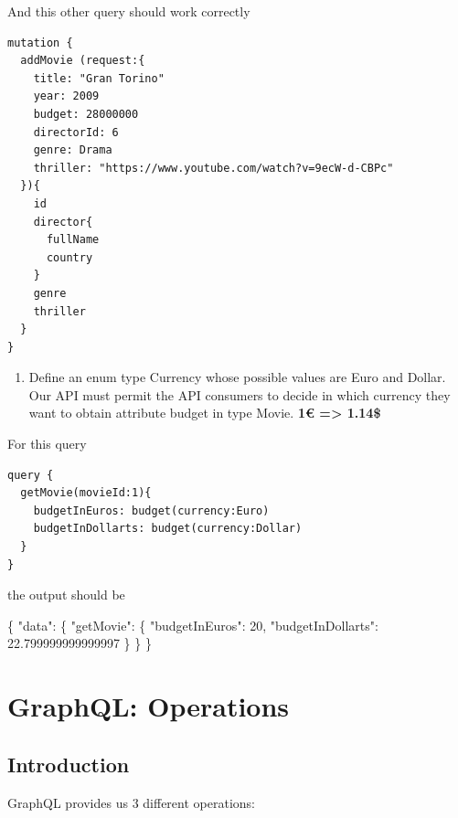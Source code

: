 \documentclass[]{book}
\newcommand{\euro}{€}
\newenvironment{Shaded}{\begin{snugshade}}{\end{snugshade}}
\newcommand{\DataTypeTok}[1]{\textcolor[rgb]{0.13,0.29,0.53}{#1}}
\newcommand{\DecValTok}[1]{\textcolor[rgb]{0.00,0.00,0.81}{#1}}
\newcommand{\FloatTok}[1]{\textcolor[rgb]{0.00,0.00,0.81}{#1}}
\newcommand{\FunctionTok}[1]{\textcolor[rgb]{0.00,0.00,0.00}{#1}}
\providecommand{\tightlist}{%
  \setlength{\itemsep}{0pt}\setlength{\parskip}{0pt}}
\begin{document}
And this other query should work correctly

\begin{verbatim}
mutation {
  addMovie (request:{
    title: "Gran Torino"
    year: 2009
    budget: 28000000
    directorId: 6
    genre: Drama
    thriller: "https://www.youtube.com/watch?v=9ecW-d-CBPc"
  }){
    id
    director{
      fullName
      country
    }
    genre
    thriller
  }
}
\end{verbatim}

\begin{enumerate}
\def\labelenumi{\arabic{enumi}.}
\setcounter{enumi}{3}
\tightlist
\item
  Define an enum type Currency whose possible values are Euro and
  Dollar. Our API must permit the API consumers to decide in which
  currency they want to obtain attribute budget in type Movie.
  \textbf{1\euro{} =\textgreater{} 1.14\$}
\end{enumerate}

For this query

\begin{verbatim}
query {
  getMovie(movieId:1){
    budgetInEuros: budget(currency:Euro)
    budgetInDollarts: budget(currency:Dollar)
  }
}
\end{verbatim}

the output should be

\begin{Shaded}
\begin{Highlighting}[]
\FunctionTok{\{}
  \DataTypeTok{"data"}\FunctionTok{:} \FunctionTok{\{}
    \DataTypeTok{"getMovie"}\FunctionTok{:} \FunctionTok{\{}
      \DataTypeTok{"budgetInEuros"}\FunctionTok{:} \DecValTok{20}\FunctionTok{,}
      \DataTypeTok{"budgetInDollarts"}\FunctionTok{:} \FloatTok{22.799999999999997}
    \FunctionTok{\}}
  \FunctionTok{\}}
\FunctionTok{\}}
\end{Highlighting}
\end{Shaded}

\chapter{GraphQL: Operations}\label{graphql-operations}

\section{Introduction}\label{introduction-2}

GraphQL provides us 3 different operations:
\end{document}
